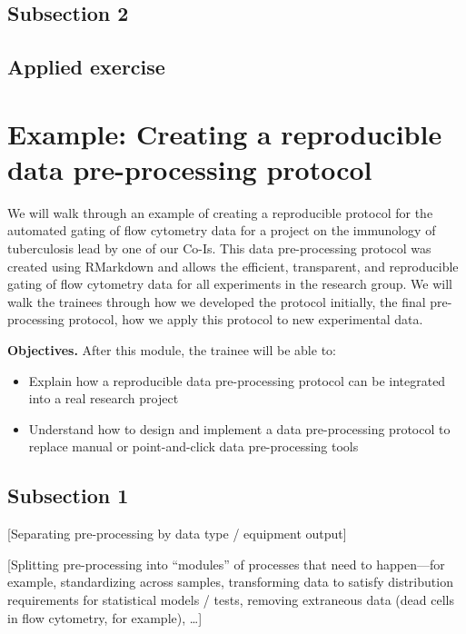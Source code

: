 \documentclass[]{tufte-book}
\providecommand{\tightlist}{%
  \setlength{\itemsep}{0pt}\setlength{\parskip}{0pt}}
\begin{document}
\hypertarget{subsection-2}{%
\subsection{Subsection 2}\label{subsection-2}}

\hypertarget{applied-exercise}{%
\subsection{Applied exercise}\label{applied-exercise}}

\hypertarget{example-creating-a-reproducible-data-pre-processing-protocol}{%
\section{Example: Creating a reproducible data pre-processing protocol}\label{example-creating-a-reproducible-data-pre-processing-protocol}}

We will walk through an example of creating a reproducible protocol for the
automated gating of flow cytometry data for a project on the immunology of
tuberculosis lead by one of our Co-Is. This data pre-processing protocol was
created using RMarkdown and allows the efficient, transparent, and reproducible
gating of flow cytometry data for all experiments in the research group. We will
walk the trainees through how we developed the protocol initially, the final
pre-processing protocol, how we apply this protocol to new experimental data.

\textbf{Objectives.} After this module, the trainee will be able to:

\begin{itemize}
\tightlist
\item
  Explain how a reproducible data pre-processing protocol can be integrated into
  a real research project
\item
  Understand how to design and implement a data pre-processing protocol to
  replace manual or point-and-click data pre-processing tools
\end{itemize}

\hypertarget{subsection-1}{%
\subsection{Subsection 1}\label{subsection-1}}

{[}Separating pre-processing by data type / equipment output{]}

{[}Splitting pre-processing into ``modules'' of processes that need to happen---for
example, standardizing across samples, transforming data to satisfy distribution
requirements for statistical models / tests, removing extraneous data (dead
cells in flow cytometry, for example), \ldots{]}
\end{document}
